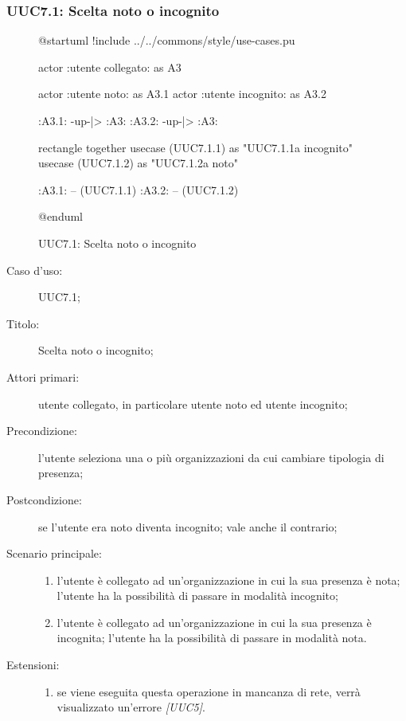 \documentclass[../../../analisi-dei-requisiti.tex]{subfiles}
\begin{document}
\subsubsection{UUC7.1: Scelta noto o incognito}%
\label{subs:UUC7.1}

\begin{figure}[H]
  \centering
  \begin{plantuml}
  @startuml
  !include ../../commons/style/use-cases.pu

  actor :utente collegato: as A3

  actor :utente noto: as A3.1
  actor :utente incognito: as A3.2

  :A3.1: -up-|> :A3:
  :A3.2: -up-|> :A3:

  rectangle {
    together {
      usecase (UUC7.1.1) as "UUC7.1.1\nPassaggio a incognito"
      usecase (UUC7.1.2) as "UUC7.1.2\nPassaggio a noto"
    }
  }

  :A3.1: -- (UUC7.1.1)
  :A3.2: -- (UUC7.1.2)

  @enduml
  \end{plantuml}
  \caption{UUC7.1: Scelta noto o incognito}%
  \label{fig:uuc7_1}
\end{figure}

\begin{description}
  \item[Caso d’uso:] UUC7.1;
  \item[Titolo:] Scelta noto o incognito;
  \item[Attori primari:] utente collegato, in particolare utente noto ed utente incognito;
  \item[Precondizione:] l'utente seleziona una o più organizzazioni da cui cambiare tipologia di presenza;
  \item[Postcondizione:] se l'utente era noto diventa incognito; vale anche il contrario;
  \item[Scenario principale:]
        \begin{enumerate}
          \item l'utente è collegato ad un'organizzazione in cui la sua presenza è nota; l'utente ha la possibilità di passare in modalità incognito;
          \item l'utente è collegato ad un'organizzazione in cui la sua presenza è incognita; l'utente ha la possibilità di passare in modalità nota.
        \end{enumerate}
  \item[Estensioni:]
        \begin{enumerate}
          \item se viene eseguita questa operazione in mancanza di rete, verrà visualizzato un'errore \emph{[UUC5]}.
        \end{enumerate}
\end{description}
\end{document}
